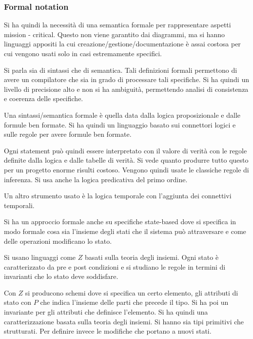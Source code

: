 \subsubsection{Formal notation}
Si ha quindi la necessità di una semantica formale per rappresentare aspetti
mission - critical. Questo non viene garantito dai diagrammi, ma si hanno
linguaggi appositi la cui creazione/gestione/documentazione è assai costosa per
cui vengono usati solo in casi estremamente specifici.

Si parla sia di sintassi che di semantica. Tali definizioni formali permettono
di avere un compilatore  che sia in grado di processare tali specifiche. Si ha
quindi un livello di precisione alto e non si ha ambiguità, permettendo analisi
di consistenza e coerenza delle specifiche.

Una sintassi/semantica formale è quella data dalla logica proposizionale e dalle
formule ben formate. Si ha quindi un linguaggio basato sui connettori logici e
sulle regole per avere formule ben formate.

Ogni statement può quindi essere interpretato con il valore di verità con le
regole definite dalla logica e dalle tabelle di verità. Si vede quanto produrre
tutto questo per un progetto enorme risulti costoso. Vengono quindi usate le
classiche regole di inferenza. Si usa anche la logica predicativa del primo ordine.

Un altro strumento usato è la logica temporale con l'aggiunta dei connettivi
temporali.

Si ha un approccio formale anche su specifiche state-based dove si specifica in
modo formale cosa sia l'insieme degli stati che il sistema può attraversare e
come delle operazioni modificano lo stato.

Si usano linguaggi come $Z$ basati sulla teoria degli insiemi. Ogni stato è
caratterizzato da pre e post condizioni e si studiano le regole in termini di
invarianti che lo stato deve soddisfare.

Con $Z$ si producono schemi dove si specifica un certo elemento, gli attributi di
stato con $P$ che indica l'insieme delle parti che precede il tipo. Si ha poi un
invariante per gli attributi che definisce l'elemento. Si ha quindi una
caratterizzazione basata sulla teoria degli insiemi. Si hanno sia tipi primitivi
che strutturati. Per definire invece le modifiche che portano a nuovi stati.

